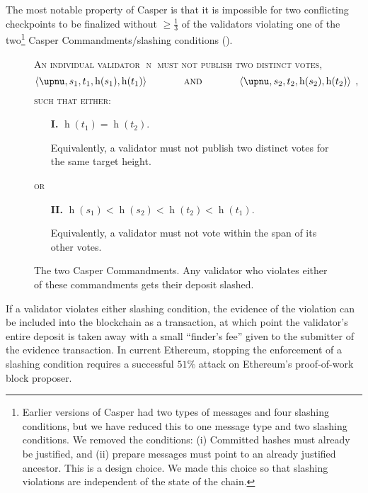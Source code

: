 \documentclass[12pt]{article}
\newcommand{\h}{\operatorname{h}\xspace}
\begin{document}
The most notable property of Casper is that it is impossible for two conflicting checkpoints to be finalized without $\geq \frac{1}{3}$ of the validators violating one of the two\footnote{Earlier versions of Casper had two types of messages and four slashing conditions\cite{minslashing}, but we have reduced this to one message type and two slashing conditions.  We removed the conditions: (i) Committed hashes must already be justified, and (ii) prepare messages must point to an already justified ancestor.  This is a design choice.  We made this choice so that slashing violations are independent of the state of the chain.} Casper Commandments/slashing conditions ().  




\begin{figure}
\begin{mdframed}
\textsc{An individual validator $\upnu$ must not publish two distinct votes,}
\begin{equation*}
\left\langle \upnu, s_1, t_1, \h(s_1), \h(t_1)\right\rangle \hspace{0.5in} \textsc{and} \hspace{0.5in} \left\langle \upnu, s_2, t_2, \h(s_2), \h(t_2)\right\rangle \; ,
\end{equation*}
\textsc{such that either:}

\begin{enumerate}
   \item[\textbf{I.}] $\h(t_1) = \h(t_2)$.

   Equivalently, a validator must not publish two distinct votes for the same target height.
\end{enumerate}
\vspace{-0.15in}
\textsc{or}

\begin{enumerate}
   \item[\textbf{II.}] $\h(s_1) < \h(s_2) < \h(t_2) < \h(t_1)$.

   Equivalently, a validator must not vote within the span of its other votes.
\end{enumerate}
\end{mdframed}
\caption{The two Casper Commandments.  Any validator who violates either of these commandments gets their deposit slashed.}
\label{fig:commandments}
\end{figure}


If a validator violates either slashing condition, the evidence of the violation can be included into the blockchain as a transaction, at which point the validator's entire deposit is taken away with a small ``finder's fee'' given to the submitter of the evidence transaction. In current Ethereum, stopping the enforcement of a slashing condition requires a successful $51\%$ attack on Ethereum's proof-of-work block proposer.
\end{document}
